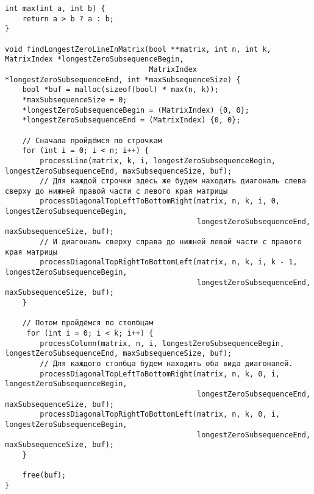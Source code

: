 \documentclass[a4paper, 12pt, oneside]{article}
\begin{document}
\begin{verbatim}
int max(int a, int b) {
    return a > b ? a : b;
}

void findLongestZeroLineInMatrix(bool **matrix, int n, int k, MatrixIndex *longestZeroSubsequenceBegin,
                                 MatrixIndex *longestZeroSubsequenceEnd, int *maxSubsequenceSize) {
    bool *buf = malloc(sizeof(bool) * max(n, k));
    *maxSubsequenceSize = 0;
    *longestZeroSubsequenceBegin = (MatrixIndex) {0, 0};
    *longestZeroSubsequenceEnd = (MatrixIndex) {0, 0};

    // Сначала пройдёмся по строчкам
    for (int i = 0; i < n; i++) {
        processLine(matrix, k, i, longestZeroSubsequenceBegin, longestZeroSubsequenceEnd, maxSubsequenceSize, buf);
        // Для каждой строчки здесь же будем находить диагональ слева сверху до нижней правой части с левого края матрицы
        processDiagonalTopLeftToBottomRight(matrix, n, k, i, 0, longestZeroSubsequenceBegin,
                                            longestZeroSubsequenceEnd, maxSubsequenceSize, buf);
        // И диагональ сверху справа до нижней левой части с правого края матрицы
        processDiagonalTopRightToBottomLeft(matrix, n, k, i, k - 1, longestZeroSubsequenceBegin,
                                            longestZeroSubsequenceEnd, maxSubsequenceSize, buf);
    }

    // Потом пройдёмся по столбцам
     for (int i = 0; i < k; i++) {
        processColumn(matrix, n, i, longestZeroSubsequenceBegin, longestZeroSubsequenceEnd, maxSubsequenceSize, buf);
        // Для каждого столбца будем находить оба вида диагоналей.
        processDiagonalTopLeftToBottomRight(matrix, n, k, 0, i, longestZeroSubsequenceBegin,
                                            longestZeroSubsequenceEnd, maxSubsequenceSize, buf);
        processDiagonalTopRightToBottomLeft(matrix, n, k, 0, i, longestZeroSubsequenceBegin,
                                            longestZeroSubsequenceEnd, maxSubsequenceSize, buf);
    }

    free(buf);
}
    \end{verbatim}
\end{document}
